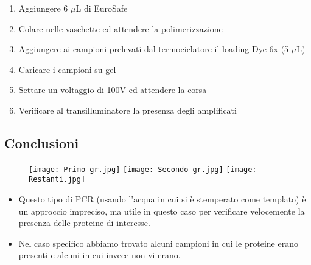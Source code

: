 \documentclass{extarticle}
\begin{document}
\begin{itemize}
\begin{enumerate}
        \item Aggiungere 6 $\mu$L di EuroSafe 
        \item Colare nelle vaschette ed attendere la polimerizzazione 
        \item Aggiungere ai campioni prelevati dal termociclatore il loading Dye 6x (5 $\mu$L) 
        \item Caricare i campioni su gel 
        \item Settare un voltaggio di 100V ed attendere la corsa 
        \item Verificare al transilluminatore la presenza degli amplificati
    \end{enumerate}
\end{itemize}
\subsection*{Conclusioni}
\begin{minipage}{0.5\textwidth}
    \begin{figure}[H]
        \texttt{[image: Primo gr.jpg]}
        \texttt{[image: Secondo gr.jpg]}
        \texttt{[image: Restanti.jpg]}
    \end{figure}
    \end{minipage} \hfill
    \begin{minipage}{0.60\textwidth}
    \begin{itemize}
        \item Questo tipo di PCR (usando l'acqua in cui si è stemperato come templato) è un approccio impreciso, ma utile in questo caso per verificare velocemente la presenza delle proteine di interesse.\\
        \item Nel caso specifico abbiamo trovato alcuni campioni in cui le proteine erano presenti e alcuni in cui invece non vi erano.
    \end{itemize}
\end{minipage}
\end{document}
